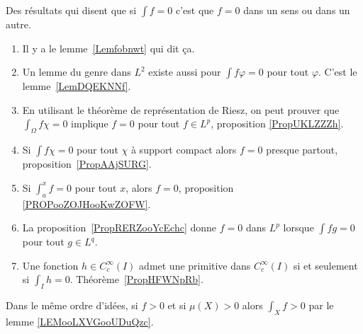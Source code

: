 		\label{THEMEooDASVooWZLOjw}
Des résultats qui disent que si \( \int f=0\) c'est que \( f=0\) dans un sens ou dans un autre.
\begin{enumerate}
	\item
	      Il y a le lemme~\ref{Lemfobnwt} qui dit ça.
	\item
	      Un lemme du genre dans \( L^2\) existe aussi pour \( \int f\varphi=0\) pour tout \( \varphi\). C'est le lemme~\ref{LemDQEKNNf}.
	\item
	      En utilisant le théorème de représentation de Riesz, on peut prouver que \( \int_{\Omega}f\chi=0\) implique \( f=0\) pour tout \( f\in L^p\), proposition \ref{PropUKLZZZh}.
	\item
	      Si \( \int f\chi=0\) pour tout \( \chi\) à support compact alors \( f=0\) presque partout, proposition~\ref{PropAAjSURG}.
	\item
	      Si \( \int_a^xf=0\) pour tout \( x\), alors \( f=0\), proposition \ref{PROPooZOJHooKwZOFW}.
	\item
	      La proposition~\ref{PropRERZooYcEchc} donne \( f=0\) dans \( L^p\) lorsque \( \int fg=0\) pour tout \( g\in L^q\).
	\item
	      Une fonction \( h\in C^{\infty}_c(I)\) admet une primitive dans \(  C^{\infty}_c(I)\) si et seulement si \( \int_Ih=0\). Théorème~\ref{PropHFWNpRb}.
\end{enumerate}

Dans le même ordre d'idées, si \( f>0\) et si \( \mu(X)>0\) alors \( \int_Xf>0\) par le lemme \ref{LEMooLXVGooUDuQzc}.
